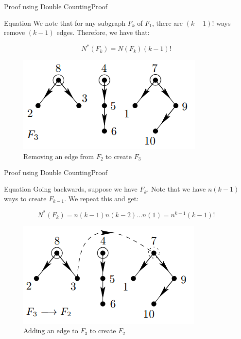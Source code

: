 \documentclass[10pt]{beamer}
\theoremstyle{definition}
\newcommand{\Stwo}{Proof using Double Counting}
\newcommand{\StwoSSproof}{Proof}
\begin{document}
\begin{frame}{\Stwo}{\StwoSSproof}

\begin{block}{Equation}
We note that for any subgraph $F_{k}$ of $F_{1}$, there are $(k-1)!$ ways remove %
$(k-1)$ edges. Therefore, we have that:

\[
  N^{*}(F_{k})=N(F_{k})(k-1)!
\]
\end{block}

\begin{figure}
  \includegraphics[width=0.6\linewidth]{images/section2_subgraph.png}
  \caption{Removing an edge from $F_{2}$ to create $F_{3}$}
  \label{fig:section2_subgraph}
\end{figure}

\end{frame}

\begin{frame}{\Stwo}{\StwoSSproof}

\begin{block}{Equation}
Going backwards, suppose we have $F_{k}$. Note that we have $n(k-1)$ ways to create $F_{k-1}$. We repeat this and get:

\[
  N^{*}(F_{k})=n(k-1)n(k-2)\ldots n(1)=n^{k-1}(k-1)!
\]
\end{block}

\begin{figure}
  \includegraphics[width=0.55\linewidth]{images/section2_rejoin.png}
  \caption{Adding an edge to $F_{3}$ to create $F_{2}$}
  \label{fig:section2_rejoin}
\end{figure}

\end{frame}
\end{document}
